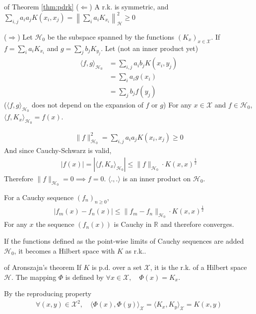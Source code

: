 \documentclass{article}
\begin{document}
\begin{Proof}{of Theorem \ref{thm:pdrk}}{}
  ($\Leftarrow$) A r.k. is symmetric, and $\sum_{i,j} a_i a_j K(x_i, x_j)
   = \left\lVert \sum_i a_i K_{x_i} \right\rVert^2_\mathcal{H} \geq 0$

  \vspace{10pt}
  ($\Rightarrow$) Let $\mathcal{H}_0$ be the subspace spanned by the functions 
  $(K_x)_{x\in \mathcal{X}}$. If $f = \sum_i a_i K_{x_i}$ and $g =
  \sum_j b_j K_{y_j}$. Let (not an inner product yet)
  \begin{align*}
    \langle f, g\rangle_{\mathcal{H}_0} &= \sum_{i,j}a_i b_j K(x_i, y_j)\\
    &= \sum_i a_i g(x_i)\\
    &= \sum_j b_j f(y_j)
  \end{align*}
  ($\langle f,g \rangle_{\mathcal{H}_0}$ does not depend on the expansion of $f$
  or $g$) For any $x\in \mathcal{X}$ and $f \in \mathcal{H}_0$, $\langle f,K_x 
  \rangle_{\mathcal{H}_0} = f(x)$.

  \begin{align*}
    \lVert f \rVert^2_{\mathcal{H}_0} = \sum_{i,j} a_i a_j K(x_i, x_j) \geq 0
  \end{align*}
  And since Cauchy-Schwarz is valid, 
  \begin{align*}
    |f(x)| = |\langle f, K_x \rangle_{\mathcal{H}_0}| \leq \lVert f 
    \rVert_{\mathcal{H}_0}\cdot K(x,x)^{\frac{1}{2}}
  \end{align*}
  Therefore $\lVert f \rVert_{\mathcal{H}_0} = 0 \implies f = 0$. $\langle ., .
  \rangle$ is an inner product on $\mathcal{H}_0$. 

  For a Cauchy sequence $(f_n)_{n\geq 0}$, 
  \begin{align*}
    |f_m(x) - f_n(x)| \leq \lVert f_m - f_n \rVert_{\mathcal{H}_0} \cdot
    K(x, x)^{\frac{1}{2}}
  \end{align*}
  For any $x$ the sequence $(f_n(x))$ is Cauchy in $\mathbb{R}$ and therefore
  converges. 

  If the functions defined as the point-wise limits of Cauchy sequences are
  added $\mathcal{H}_0$, it becomes a Hilbert space with $K$ as r.k..
\end{Proof}

\begin{Proof}{of Aronszajn's theorem}{}
  If $K$ is p.d. over a set $\mathcal{X}$, it is the r.k. of a Hilbert space 
  $\mathcal{H}$. The mapping $\Phi$ is defined by $\forall x \in \mathcal{X}, 
  \quad \Phi(x) = K_x$.

  By the reproducing property 
  \begin{align*}
    \forall (x,y)\in \mathcal{X}^2,\quad \langle \Phi(x), \Phi(y) 
    \rangle_\mathcal{X} = \langle K_x, K_y \rangle_\mathcal{X} = K(x, y)
  \end{align*}
\end{Proof}
\end{document}
